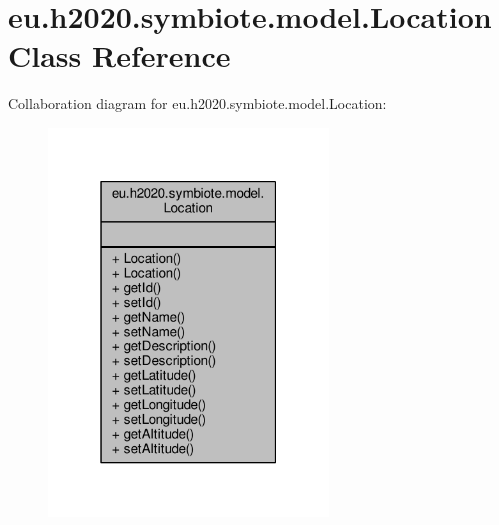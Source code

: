 \hypertarget{classeu_1_1h2020_1_1symbiote_1_1model_1_1Location}{}\section{eu.\+h2020.\+symbiote.\+model.\+Location Class Reference}
\label{classeu_1_1h2020_1_1symbiote_1_1model_1_1Location}


Collaboration diagram for eu.\+h2020.\+symbiote.\+model.\+Location\+:
\nopagebreak
\begin{figure}[H]
\begin{center}
\leavevmode
\includegraphics[width=211pt]{classeu_1_1h2020_1_1symbiote_1_1model_1_1Location__coll__graph}
\end{center}
\end{figure}
